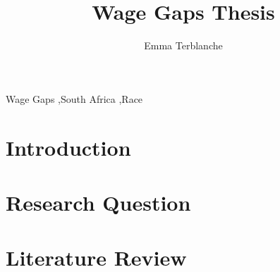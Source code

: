 \documentclass[11pt,preprint, authoryear]{elsarticle}
\numberwithin{equation}{section}
\numberwithin{figure}{section}
\numberwithin{table}{section}
\begin{document}
\begin{frontmatter}  %

\title{Wage Gaps Thesis}





\author[Add1]{Emma Terblanche}





\address[Add1]{Stellenbosch University}



\vspace{1cm}


\begin{keyword}
\footnotesize{
Wage Gaps \sep South Africa \sep Race \\
\vspace{0.3cm}
}
\end{keyword}



\vspace{0.5cm}

\end{frontmatter}



\pagestyle{fancy}
\chead{}
\rhead{}
\lfoot{}
\lhead{}
\cfoot{}


\headsep 35pt %




\hypertarget{introduction}{%
\section{Introduction}\label{introduction}}

\hypertarget{research-question}{%
\section{Research Question}\label{research-question}}

\hypertarget{literature-review}{%
\section{Literature Review}\label{literature-review}}
\end{document}
